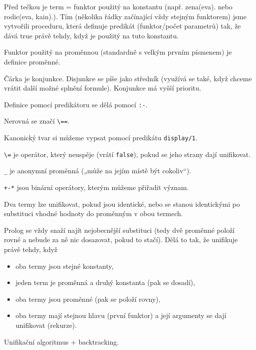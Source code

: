 \documentclass[12pt]{article}					%
\begin{document}
\begin{definice}
	Před tečkou je term = funktor použitý na konstantu (např. zena(eva). nebo rodic(eva, kain).). Tím (několika řádky začínající vždy stejným funktorem) jsme vytvořili proceduru, která definuje predikát (funktor/počet parametrů) tak, že dává true právě tehdy, když je použitý na tuto konstantu.

	Funktor použitý na proměnnou (standardně s velkým prvním písmenem) je definice proměnné.

	Čárka je konjunkce. Disjunkce se píše jako středník (využívá se také, když chceme vrátit další možné splnění formule). Konjunkce má vyšší prioritu.

	Definice pomocí predikátoru se dělá pomocí \verb|:-|.

	Nerovná se značí \verb|\==|.


	Kanonický tvar si můžeme vypsat pomocí predikátu \verb|display/1|.

	\verb|\=| je operátor, který neuspěje (vrátí \verb|false|), pokud se jeho strany dají unifikovat.

	\verb|_| je anonymní proměnná („může na jejím místě být cokoliv“).

	\verb|+-*| jsou binární operátory, kterým můžeme přiřadit význam.
\end{definice}

\begin{definice}[Unifikace]
	Dva termy lze unifikovat, pokud jsou identické, nebo se stanou identickými po substituci vhodné hodnoty do proměnným v obou termech.

	Prolog se vždy snaží najít nejobecnější substituci (tedy dvě proměnné položí rovné a nebude za ně nic dosazovat, pokud to stačí). Dělá to tak, že unifikuje právě tehdy, když

	\begin{itemize}
		\item oba termy jsou stejné konstanty,
		\item jeden term je proměnná a druhý konstanta (pak se dosadí),
		\item oba termy jsou proměnné (pak se položí rovny),
		\item oba termy mají stejnou hlavu (první funktor) a její argumenty se dají unifikovat (rekurze).
	\end{itemize}
\end{definice}

\begin{definice}
	Unifikační algoritmus + backtracking.
\end{definice}
\end{document}

